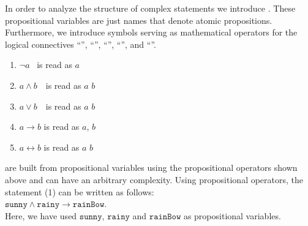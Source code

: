 In order to analyze the structure of complex statements we introduce
.
These propositional variables are just names that denote atomic propositions.
Furthermore, we introduce symbols serving as mathematical operators for the logical connectives
``'', ``'', ``'', ``'', and 
``''.
\begin{enumerate}
\item $\neg a$ \quad\quad\ is read as \quad {} $a$ 
      \vspace*{-0.2cm}

\item $a \wedge b$ \,\quad\ is read as \quad $a$  $b$
      \vspace*{-0.2cm}

\item $a \vee b$ \,\quad\ is read as \quad $a$  $b$
      \vspace*{-0.2cm}

\item $a \rightarrow b$   \quad is read as \quad {} $a$,  $b$
      \vspace*{-0.2cm}

\item $a \leftrightarrow b$  \quad is read as \quad  $a$  $b$
\end{enumerate}
 are built from propositional variables using the propositional operators shown
above and can have an arbitrary complexity.
Using propositional operators, the statement (1) can be written as follows:
 \\[0.2cm]
\hspace*{1.3cm}
$\texttt{sunny} \wedge \texttt{rainy} \rightarrow \texttt{rainBow}$.
\\[0.2cm]
Here, we have used  $\texttt{sunny}$, $\texttt{rainy}$ and $\texttt{rainBow}$ as propositional variables.

